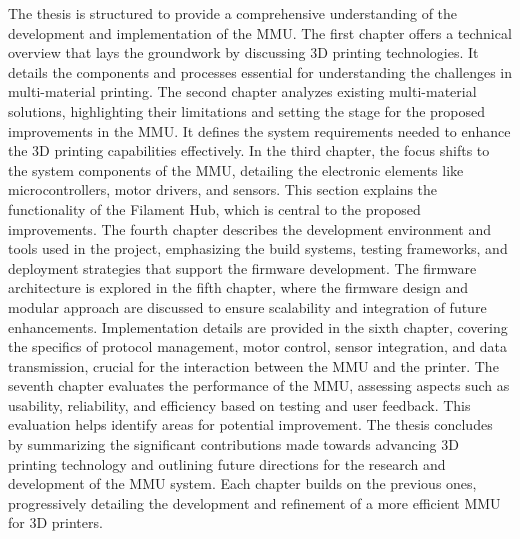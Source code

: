 The thesis is structured to provide a comprehensive understanding of the development and implementation of the MMU. The first chapter offers a technical overview that lays the groundwork by discussing 3D printing technologies. It details the components and processes essential for understanding the challenges in multi-material printing. The second chapter analyzes existing multi-material solutions, highlighting their limitations and setting the stage for the proposed improvements in the MMU. It defines the system requirements needed to enhance the 3D printing capabilities effectively. In the third chapter, the focus shifts to the system components of the MMU, detailing the electronic elements like microcontrollers, motor drivers, and sensors. This section explains the functionality of the Filament Hub, which is central to the proposed improvements. The fourth chapter describes the development environment and tools used in the project, emphasizing the build systems, testing frameworks, and deployment strategies that support the firmware development. The firmware architecture is explored in the fifth chapter, where the firmware design and modular approach are discussed to ensure scalability and integration of future enhancements. Implementation details are provided in the sixth chapter, covering the specifics of protocol management, motor control, sensor integration, and data transmission, crucial for the interaction between the MMU and the printer. The seventh chapter evaluates the performance of the MMU, assessing aspects such as usability, reliability, and efficiency based on testing and user feedback. This evaluation helps identify areas for potential improvement. The thesis concludes by summarizing the significant contributions made towards advancing 3D printing technology and outlining future directions for the research and development of the MMU system. Each chapter builds on the previous ones, progressively detailing the development and refinement of a more efficient MMU for 3D printers.






